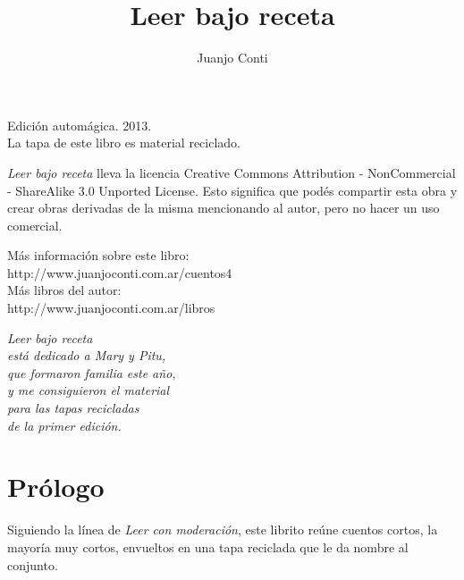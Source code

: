 \documentclass[11pt,twoside,openright,a6paper]{book}
\title{Leer bajo receta}
\author{Juanjo Conti}
\date{}
\begin{document}
\pagestyle{plain}

\maketitle

\cleardoublepage

\thispagestyle{empty}
\noindent
Edición automágica. 2013.\\
La tapa de este libro es material reciclado.

\vspace{0.5cm}

\noindent
\emph{Leer bajo receta} lleva la licencia 
Creative Commons Attribution - NonCommercial - ShareAlike 3.0 Unported License.
Esto significa que podés compartir esta obra y crear obras derivadas de la misma
mencionando al autor, pero no ha\-cer un uso comercial.

\vfill

\noindent
Más información sobre este libro:\\
http://www.juanjoconti.com.ar/cuentos4\\

\noindent
Más libros del autor:\\
http://www.juanjoconti.com.ar/libros

\cleardoublepage

\noindent
\begin{flushright}
\emph{
\emph{Leer bajo receta}\\
está dedicado a Mary y Pitu,\\
que formaron familia este año,\\
y me consiguieron el material\\
para las tapas recicladas\\
de la primer edición.}
\end{flushright}

\cleardoublepage

\renewcommand*\contentsname{Índice}

\tableofcontents

\chapter*{Prólogo}

Siguiendo la línea de \emph{Leer con moderación}, este librito reúne cuentos cortos, la mayoría muy cortos, envueltos en una tapa reciclada que le da nombre al conjunto.
\end{document}
